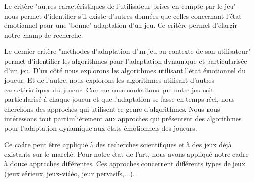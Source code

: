 \documentclass[11pt]{article}
\begin{document}
		Le critère "autres caractéristiques de l'utilisateur prises en compte par le jeu" nous permet d'identifier s'il existe d'autres données que celles concernant l'état émotionnel pour une "bonne" adaptation d'un jeu.
		Ce critère permet d'élargir notre champ de recherche.\par
		Le dernier critère "méthodes d'adaptation d'un jeu au contexte de son utilisateur" permet d'identifier les algorithmes pour l'adaptation dynamique et particularisée d'un jeu.
		D'un côté nous explorons les algorithmes utilisant l'état émotionnel du joueur.
		Et de l'autre, nous explorons les algorithmes utilisant d'autres caractéristiques du joueur.
		Comme nous souhaitons que notre jeu soit particularisé à chaque joueur et que l'adaptation se fasse en temps-réel, nous cherchons des approches qui utilisent ce genre d'algorithmes.
		Nous nous intéressons tout particulièrement aux approches qui présentent des algorithmes pour l'adaptation dynamique aux états émotionnels des joueurs.\par
		Ce cadre peut être appliqué à des recherches scientifiques et à des jeux déjà existants sur le marché.
		Pour notre état de l'art, nous avons appliqué notre cadre à douze approches différentes.
		Ces approches concernent différents types de jeux (jeux sérieux, jeux-vidéo, jeux pervasifs,...).
\end{document}
